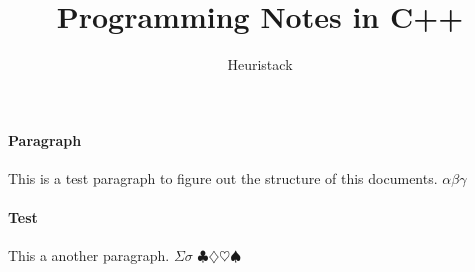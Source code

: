 \documentclass[a4paper,12pt]{report}
\title{Programming Notes in C++}
\author{Heuristack}
\begin{document}
%
%
%
%
%

\begin{center}
\end{center}

\paragraph{Paragraph}
This is a test paragraph to figure out the structure of this documents.
$\alpha\beta\gamma$

\paragraph{Test}
This a another paragraph.
$\Sigma\sigma$
$\clubsuit \diamondsuit \heartsuit \spadesuit$
\end{document}
